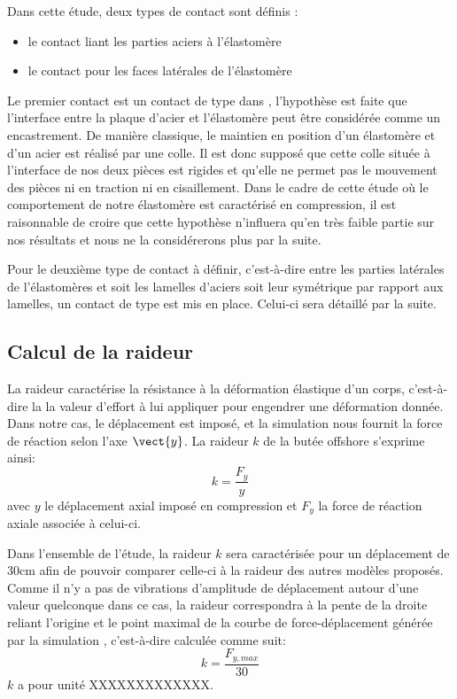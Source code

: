 ﻿\documentclass{article}
\newcommand{\abaqus}{\bsc{Abaqus}\xspace}
\begin{document}
Dans cette étude, deux types de contact sont définis :
\begin{itemize}
\item le contact liant les parties aciers à l'élastomère
\item le contact pour les faces latérales de l'élastomère
\end{itemize}

Le premier contact est un contact de type  dans \abaqus, l'hypothèse est faite que l'interface entre la plaque d'acier et l'élastomère peut être considérée comme un encastrement. De manière classique, le maintien en position d'un élastomère et d'un acier est réalisé par une colle. Il est donc supposé que cette colle située à l'interface de nos deux pièces est rigides et qu'elle ne permet pas le mouvement des pièces ni en traction ni en cisaillement. Dans le cadre de cette étude où le comportement de notre élastomère est caractérisé en compression, il est raisonnable de croire que cette hypothèse n'influera qu'en très faible partie sur nos résultats et nous ne la considérerons plus par la suite.

Pour le deuxième type de contact à définir, c'est-à-dire entre les parties latérales de l'élastomères et soit les lamelles d'aciers soit leur symétrique par rapport aux lamelles, un contact de type  est mis en place. Celui-ci sera détaillé par la suite.

\subsection{Calcul de la raideur}

La raideur caractérise la résistance à la déformation élastique d'un corps, c'est-à-dire la la valeur d'effort à lui appliquer pour engendrer une déformation donnée. Dans notre cas, le déplacement est imposé, et la simulation \abaqus nous fournit la force de réaction selon l'axe $\vect{y}$. La raideur $k$ de la butée offshore s'exprime ainsi:
\begin{displaymath}
		k=\frac{F_{y}}{y}
	\end{displaymath}
avec $y$ le déplacement axial imposé en compression et $F_{y}$ la force de réaction axiale associée à celui-ci. 

Dans l'ensemble de l'étude, la raideur $k$ sera caractérisée pour un déplacement de 30cm afin de pouvoir comparer celle-ci à la raideur des autres modèles proposés. Comme il n'y a pas de vibrations d'amplitude de déplacement autour d'une valeur quelconque dans ce cas, la raideur correspondra à la pente de la droite reliant l'origine et le point maximal de la courbe de force-déplacement générée par la simulation \abaqus, c'est-à-dire calculée comme suit:
\begin{displaymath}
		k=\frac{F_{y,max}}{30}
	\end{displaymath}
$k$ a pour unité XXXXXXXXXXXXX.
\end{document}
